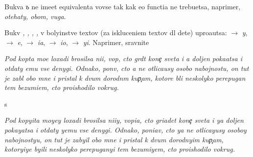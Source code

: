 \documentclass[10pt]{article}
\begin{document}
\noindent
Bukva \textit{ъ} ne ime{\y}et equivalenta vovse tak kak {\y}e{\y}o functi{\y}a ne trebu{\y}etsa,
naprimer, \textit{ot{\y}ehaty, ob{\y}om, v{\y}uga}.

Bukv{\yi} \textit{{\y}, {\e}, {\ia}, {\io}, {\yi}} v boly{\x}instve textov (za iskluceni{\y}em
textov dl{\ia} dete{\y}) upro{\x}a{\y}utsa:
    \textit{{\y}}  $\rightarrow$ \textit{y},
    \textit{{\e}}  $\rightarrow$ \textit{e},
    \textit{{\ia}} $\rightarrow$ \textit{ia},
    \textit{{\io}} $\rightarrow$ \textit{io},
    \textit{{\yi}} $\rightarrow$ \textit{yi}.
Naprimer, sravnite

\textit{
    Pod kop{\yi}ta mo{\y}e{\y} loxadi brosilsa ni{\x}i{\y}, vop{\ia}, cto gr{\ia}d{\e}t kone{\c} sveta i {\y}a doljen poka{\y}atsa i otdaty {\y}emu vse denygi. Odnako, pon{\ia}v, cto {\y}a ne otlica{\y}usy osobo{\y} nabojnost{\y}u, on tut je zab{\yi}l obo mne i pristal k dvum dorodn{\yi}m kup{\c}am, kotor{\yi}{\y}e b{\yi}li neskolyko perepugan{\yi} tem bezumi{\y}em, cto proishodilo vokrug.
}

\noindent s

\textit{
    Pod kopyita moyey loxadi brosilsa ni{\x}iy, vopia, cto griadet kone{\c} sveta i ya doljen pokayatsa i otdaty yemu vse denygi. Odnako, poniav, cto ya ne otlicayusy osoboy nabojnostyu, on tut je zabyil obo mne i pristal k dvum dorodnyim kup{\c}am, kotoryiye byili neskolyko perepuganyi tem bezumiyem, cto proishodilo vokrug.
}


\end{document}
